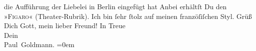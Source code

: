 \begin{ledgroupsized}[t]{13cm}
{{{                     die Aufführung der Liebelei in Berlin eingefügt hat}}}\label{K_L02767-8h} Anbei erhältſt Du den »\textsc{Figaro}« (Theater-Rubrik). Ich bin ſehr {\pb}ſtolz auf
               meinen franzöſiſchen Styl.\pend
           \pstart
           Grüß Dich Gott, mein lieber Freund!\pend
           \pstart
           In Treue {\\[\baselineskip]}Dein {\\[\baselineskip]}\spacefill\mbox{Paul Goldmann.}\pend
           \leftskip=0em{}
         
         \endnumbering{}\end{ledgroupsized}  \newcommand{\dateiname}{L02767}\newcommand{\titel}{Paul Goldmann an Arthur Schnitzler, 6. 2. [1896]}\newcommand{\editorInnen}{Martin Anton Müller und Laura Untner}
      